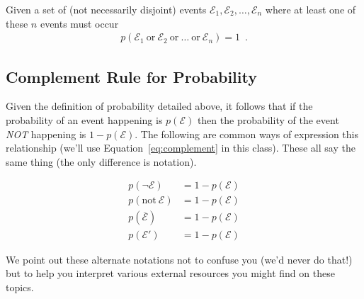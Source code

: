 \documentclass[assignment01_Solutions]{subfiles}
\begin{document}
\item Given a set of (not necessarily disjoint) events $\mathcal{E}_1, \mathcal{E}_2, \ldots, \mathcal{E}_n$ where at least one of these $n$ events must occur
\begin{align}
p(\mathcal{E}_1~\mbox{or}~\mathcal{E}_2~\mbox{or}~\ldots~\mbox{or}~\mathcal{E}_n) = 1 \enspace .
\end{align}
\ei
\subsection{Complement Rule for Probability}

Given the definition of probability detailed above, it follows that if the probability of an event happening is $p(\mathcal{E})$ then the probability of the event \emph{NOT} happening is $1-p(\mathcal{E})$.   The following are common ways of expression this relationship (we'll use Equation~\ref{eq:complement} in this class).  These all say the same thing (the only difference is notation).

\begin{align}
p(\neg \mathcal{E}) &= 1 - p(\mathcal{E}) \label{eq:complement} \\
p(\mbox{not}~\mathcal{E}) &= 1 - p(\mathcal{E}) \nonumber \\
p(\overline{\mathcal{E}}) &= 1 - p(\mathcal{E}) \nonumber \\
p(\mathcal{E}') &= 1 - p(\mathcal{E}) \nonumber
\end{align}

We point out these alternate notations not to confuse you (we'd never do that!) but to help you interpret various external resources you might find on these topics.
\end{document}
